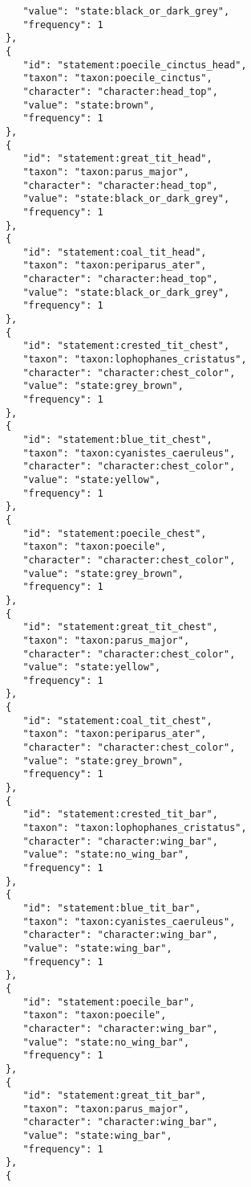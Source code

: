 \documentclass[10pt,letterpaper]{article}
\begin{document}
\begin{verbatim}
         "value": "state:black_or_dark_grey",
         "frequency": 1
      },
      {
         "id": "statement:poecile_cinctus_head",
         "taxon": "taxon:poecile_cinctus",
         "character": "character:head_top",
         "value": "state:brown",
         "frequency": 1
      },
      {
         "id": "statement:great_tit_head",
         "taxon": "taxon:parus_major",
         "character": "character:head_top",
         "value": "state:black_or_dark_grey",
         "frequency": 1
      },
      {
         "id": "statement:coal_tit_head",
         "taxon": "taxon:periparus_ater",
         "character": "character:head_top",
         "value": "state:black_or_dark_grey",
         "frequency": 1
      },
      {
         "id": "statement:crested_tit_chest",
         "taxon": "taxon:lophophanes_cristatus",
         "character": "character:chest_color",
         "value": "state:grey_brown",
         "frequency": 1
      },
      {
         "id": "statement:blue_tit_chest",
         "taxon": "taxon:cyanistes_caeruleus",
         "character": "character:chest_color",
         "value": "state:yellow",
         "frequency": 1
      },
      {
         "id": "statement:poecile_chest",
         "taxon": "taxon:poecile",
         "character": "character:chest_color",
         "value": "state:grey_brown",
         "frequency": 1
      },
      {
         "id": "statement:great_tit_chest",
         "taxon": "taxon:parus_major",
         "character": "character:chest_color",
         "value": "state:yellow",
         "frequency": 1
      },
      {
         "id": "statement:coal_tit_chest",
         "taxon": "taxon:periparus_ater",
         "character": "character:chest_color",
         "value": "state:grey_brown",
         "frequency": 1
      },
      {
         "id": "statement:crested_tit_bar",
         "taxon": "taxon:lophophanes_cristatus",
         "character": "character:wing_bar",
         "value": "state:no_wing_bar",
         "frequency": 1
      },
      {
         "id": "statement:blue_tit_bar",
         "taxon": "taxon:cyanistes_caeruleus",
         "character": "character:wing_bar",
         "value": "state:wing_bar",
         "frequency": 1
      },
      {
         "id": "statement:poecile_bar",
         "taxon": "taxon:poecile",
         "character": "character:wing_bar",
         "value": "state:no_wing_bar",
         "frequency": 1
      },
      {
         "id": "statement:great_tit_bar",
         "taxon": "taxon:parus_major",
         "character": "character:wing_bar",
         "value": "state:wing_bar",
         "frequency": 1
      },
      {

\end{verbatim}
\end{document}
